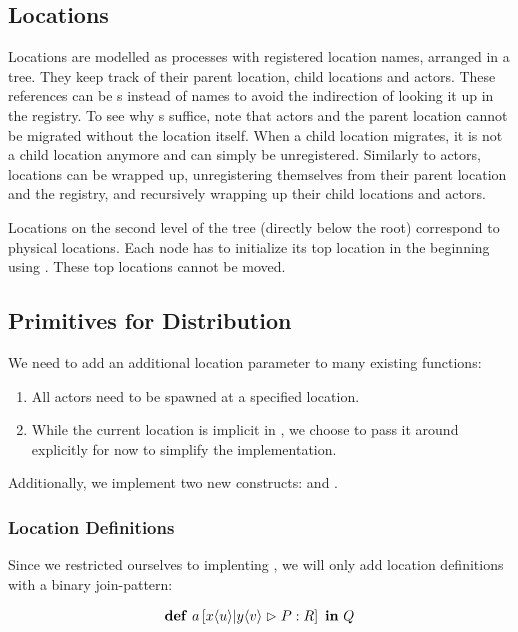 \subsection{Locations}

Locations are modelled as processes with registered location names,
arranged in a tree.
They keep track of their parent location, child locations and actors.
These references can be \PID{}s instead of names
to avoid the indirection of looking it up in the registry.
To see why \PID{}s suffice, note that actors and the parent location
cannot be migrated without the location itself.
When a child location migrates, it is not a child location anymore and can
simply be unregistered.
Similarly to actors, locations can be wrapped up,
unregistering themselves from their parent location and the registry,
and recursively wrapping up their child locations and actors.

Locations on the second level of the tree (directly below the root)
correspond to physical locations.
Each node has to initialize its top location in the beginning using
. These top locations cannot be moved.


\subsection{Primitives for Distribution}

We need to add an additional location parameter to many existing functions:
\begin{enumerate}[nosep]
  \item
    All actors need to be spawned at a specified location.
  \item
    While the current location is implicit in \distjoincalc,
    we choose to pass it around explicitly for now
    to simplify the implementation.
\end{enumerate}

Additionally, we implement two new constructs:
 and .

\subsubsection{Location Definitions}
Since we restricted ourselves to implenting \corejoincalc,
we will only add location definitions with a binary join-pattern:

\begin{align*}
  \textbf{\textup{def}} \ a \left[ x\langle u\rangle | y\langle v\rangle \vartriangleright P : R \right] \ \textbf{\textup{in}} \ Q
\end{align*}

